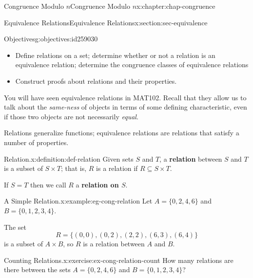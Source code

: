 \documentclass[oneside,10pt,]{book}
\newcommand{\terminology}[1]{\textbf{#1}}
\numberwithin{equation}{section}
\begin{document}
\begin{chapterptx}{Congruence Modulo \(n\)}{}{Congruence Modulo \(n\)}{}{}{x:chapter:chap-congruence}
%
%
\typeout{************************************************}
\typeout{************************************************}
%
\begin{sectionptx}{Equivalence Relations}{}{Equivalence Relations}{}{}{x:section:sec-equivalence}
\begin{objectives}{Objectives}{g:objectives:id259030}
%
\begin{itemize}[label=\textbullet]
\item{}Define relations on a set; determine whether or not a relation is an equivalence relation; determine the congruence classes of equivalence relations%
\item{}Construct proofs about relations and their properties.%
\end{itemize}
\end{objectives}
You will have seen equivalence relations in MAT102. Recall that they allow us to talk about the \emph{same-ness} of objects in terms of some defining characteristic, even if those two objects are not necessarily \emph{equal}.%
\par
Relations generalize functions; equivalence relations are relations that satisfy a number of properties.%
\begin{definition}{Relation.}{x:definition:def-relation}%
Given sets \(S\) and \(T\), a \terminology{relation} between \(S\) and \(T\) is a subset of \(S \times T\); that is, \(R\) is a relation if \(R \subseteq S \times T\).%
\par
If \(S = T\) then we call \(R\) a \terminology{relation on \(S\)}.%
\end{definition}
\begin{example}{A Simple Relation.}{x:example:eg-cong-relation}%
Let \(A = \{0,2,4,6\}\) and \(B = \{0,1,2,3,4\}\).%
\par
The set%
\begin{equation*}
R = \{(0,0),(0,2),(2,2),(6,3),(6,4)\}
\end{equation*}
is a subset of \(A \times B\), so \(R\) is a relation between \(A\) and \(B\).%
\end{example}
\begin{inlineexercise}{Counting Relations.}{x:exercise:ex-cong-relation-count}%
How many relations are there between the sets \(A = \{0,2,4,6\}\) and \(B = \{0,1,2,3,4\}\)?%
\par\smallskip%

\end{inlineexercise}
\end{sectionptx}
\end{chapterptx}
\end{document}
